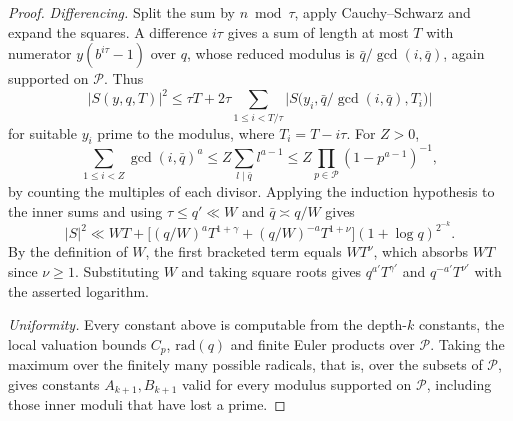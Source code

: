 \documentclass[11pt]{article}
\begin{document}
\begin{proof}
\emph{Differencing.} Split the sum by \(n\bmod\tau\), apply
Cauchy--Schwarz and expand the squares. A difference \(i\tau\) gives a sum
of length at most \(T\) with numerator \(y(b^{i\tau}-1)\) over \(q\), whose
reduced modulus is \(\bar q/\gcd(i,\bar q)\), again supported on
\(\mathcal P\). Thus
\[
 |S(y,q,T)|^2\le\tau T+2\tau\sum_{1\le i<T/\tau}
 \bigl|S\bigl(y_i,\bar q/\gcd(i,\bar q),T_i\bigr)\bigr|
\]
for suitable \(y_i\) prime to the modulus, where \(T_i=T-i\tau\). For \(Z>0\),
\[
 \sum_{1\le i<Z}\gcd(i,\bar q)^a
 \le Z\sum_{l\mid \bar q}l^{a-1}
 \le Z\prod_{p\in\mathcal P}(1-p^{a-1})^{-1},
\]
by counting the multiples of each divisor. Applying the induction
hypothesis to the inner sums and using \(\tau\le q'\ll W\) and
\(\bar q\asymp q/W\) gives
\[
 |S|^2\ll WT+
 \big[(q/W)^a T^{1+\gamma}+(q/W)^{-a}T^{1+\nu}\big]
 (1+\log q)^{2^{-k}}.
\]
By the definition of \(W\), the first bracketed term equals \(WT^\nu\),
which absorbs \(WT\) since \(\nu\ge1\). Substituting \(W\) and taking
square roots gives \(q^{a'}T^{\gamma'}\) and \(q^{-a'}T^{\nu'}\) with the
asserted logarithm.

\emph{Uniformity.} Every constant above is computable from the
depth-\(k\) constants, the local valuation bounds \(C_p\), \(\mathrm{rad}(q)\)
and finite Euler products over \(\mathcal P\). Taking the maximum over the
finitely many possible radicals, that is, over the subsets of
\(\mathcal P\), gives constants \(A_{k+1},B_{k+1}\) valid for every modulus
supported on \(\mathcal P\), including those inner moduli that have lost a
prime.
\end{proof}
\end{document}
